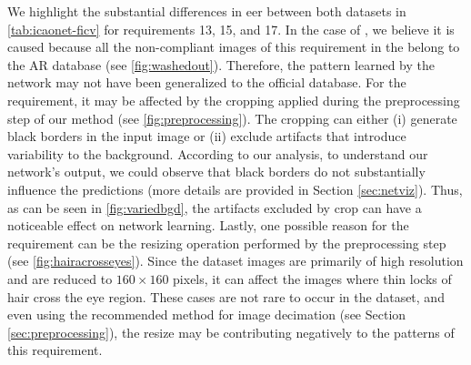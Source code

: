 We highlight the substantial differences in \acs{eer} between both datasets in \autoref{tab:icaonet-ficv} for requirements 13, 15, and 17. In the case of \washedout, we believe it is caused because all the non-compliant images of this requirement in the \ficvtest belong to the AR database (see \autoref{fig:washedout}). Therefore, the pattern learned by the network may not have been generalized to the official database. For the \variedbackground requirement, it may be affected by the cropping applied during the preprocessing step of our method (see \autoref{fig:preprocessing}). The cropping can either (i) generate black borders in the input image or (ii) exclude artifacts that introduce variability to the background. According to our analysis, to understand our network's output, we could observe that black borders do not substantially influence the predictions (more details are provided in Section \ref{sec:netviz}). Thus, as can be seen in \autoref{fig:variedbgd}, the artifacts excluded by crop can have a noticeable effect on network learning. Lastly, one possible reason for the \hairacrosseyes requirement can be the resizing operation performed by the preprocessing step (see \autoref{fig:hairacrosseyes}). Since the \adhoc dataset images are primarily of high resolution and are reduced to $160 \times 160$ pixels, it can affect the images where thin locks of hair cross the eye region. These cases are not rare to occur in the dataset, and even using the recommended method for image decimation (see Section \ref{sec:preprocessing}), the resize may be contributing negatively to the patterns of this requirement. 
 

